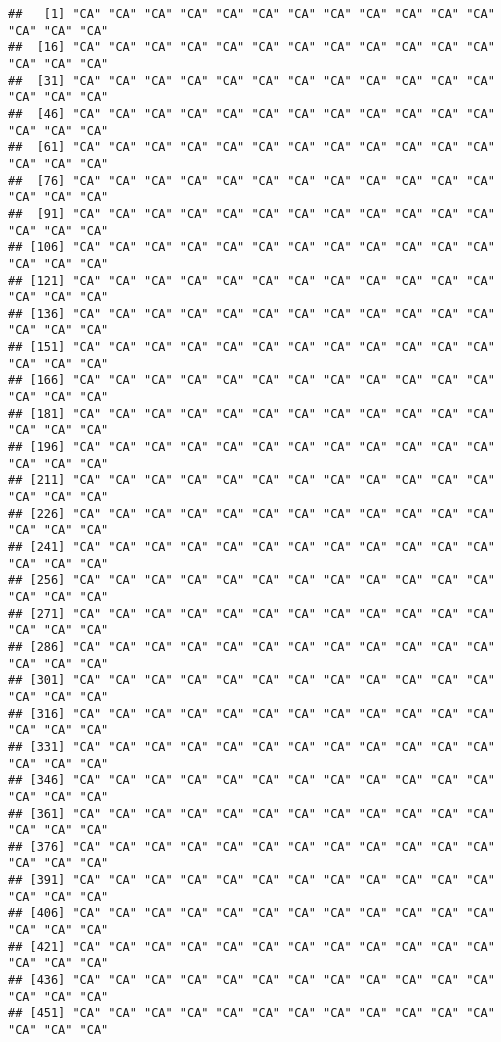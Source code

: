 \documentclass[
]{article}
\begin{document}
\begin{verbatim}
##   [1] "CA" "CA" "CA" "CA" "CA" "CA" "CA" "CA" "CA" "CA" "CA" "CA" "CA" "CA" "CA"
##  [16] "CA" "CA" "CA" "CA" "CA" "CA" "CA" "CA" "CA" "CA" "CA" "CA" "CA" "CA" "CA"
##  [31] "CA" "CA" "CA" "CA" "CA" "CA" "CA" "CA" "CA" "CA" "CA" "CA" "CA" "CA" "CA"
##  [46] "CA" "CA" "CA" "CA" "CA" "CA" "CA" "CA" "CA" "CA" "CA" "CA" "CA" "CA" "CA"
##  [61] "CA" "CA" "CA" "CA" "CA" "CA" "CA" "CA" "CA" "CA" "CA" "CA" "CA" "CA" "CA"
##  [76] "CA" "CA" "CA" "CA" "CA" "CA" "CA" "CA" "CA" "CA" "CA" "CA" "CA" "CA" "CA"
##  [91] "CA" "CA" "CA" "CA" "CA" "CA" "CA" "CA" "CA" "CA" "CA" "CA" "CA" "CA" "CA"
## [106] "CA" "CA" "CA" "CA" "CA" "CA" "CA" "CA" "CA" "CA" "CA" "CA" "CA" "CA" "CA"
## [121] "CA" "CA" "CA" "CA" "CA" "CA" "CA" "CA" "CA" "CA" "CA" "CA" "CA" "CA" "CA"
## [136] "CA" "CA" "CA" "CA" "CA" "CA" "CA" "CA" "CA" "CA" "CA" "CA" "CA" "CA" "CA"
## [151] "CA" "CA" "CA" "CA" "CA" "CA" "CA" "CA" "CA" "CA" "CA" "CA" "CA" "CA" "CA"
## [166] "CA" "CA" "CA" "CA" "CA" "CA" "CA" "CA" "CA" "CA" "CA" "CA" "CA" "CA" "CA"
## [181] "CA" "CA" "CA" "CA" "CA" "CA" "CA" "CA" "CA" "CA" "CA" "CA" "CA" "CA" "CA"
## [196] "CA" "CA" "CA" "CA" "CA" "CA" "CA" "CA" "CA" "CA" "CA" "CA" "CA" "CA" "CA"
## [211] "CA" "CA" "CA" "CA" "CA" "CA" "CA" "CA" "CA" "CA" "CA" "CA" "CA" "CA" "CA"
## [226] "CA" "CA" "CA" "CA" "CA" "CA" "CA" "CA" "CA" "CA" "CA" "CA" "CA" "CA" "CA"
## [241] "CA" "CA" "CA" "CA" "CA" "CA" "CA" "CA" "CA" "CA" "CA" "CA" "CA" "CA" "CA"
## [256] "CA" "CA" "CA" "CA" "CA" "CA" "CA" "CA" "CA" "CA" "CA" "CA" "CA" "CA" "CA"
## [271] "CA" "CA" "CA" "CA" "CA" "CA" "CA" "CA" "CA" "CA" "CA" "CA" "CA" "CA" "CA"
## [286] "CA" "CA" "CA" "CA" "CA" "CA" "CA" "CA" "CA" "CA" "CA" "CA" "CA" "CA" "CA"
## [301] "CA" "CA" "CA" "CA" "CA" "CA" "CA" "CA" "CA" "CA" "CA" "CA" "CA" "CA" "CA"
## [316] "CA" "CA" "CA" "CA" "CA" "CA" "CA" "CA" "CA" "CA" "CA" "CA" "CA" "CA" "CA"
## [331] "CA" "CA" "CA" "CA" "CA" "CA" "CA" "CA" "CA" "CA" "CA" "CA" "CA" "CA" "CA"
## [346] "CA" "CA" "CA" "CA" "CA" "CA" "CA" "CA" "CA" "CA" "CA" "CA" "CA" "CA" "CA"
## [361] "CA" "CA" "CA" "CA" "CA" "CA" "CA" "CA" "CA" "CA" "CA" "CA" "CA" "CA" "CA"
## [376] "CA" "CA" "CA" "CA" "CA" "CA" "CA" "CA" "CA" "CA" "CA" "CA" "CA" "CA" "CA"
## [391] "CA" "CA" "CA" "CA" "CA" "CA" "CA" "CA" "CA" "CA" "CA" "CA" "CA" "CA" "CA"
## [406] "CA" "CA" "CA" "CA" "CA" "CA" "CA" "CA" "CA" "CA" "CA" "CA" "CA" "CA" "CA"
## [421] "CA" "CA" "CA" "CA" "CA" "CA" "CA" "CA" "CA" "CA" "CA" "CA" "CA" "CA" "CA"
## [436] "CA" "CA" "CA" "CA" "CA" "CA" "CA" "CA" "CA" "CA" "CA" "CA" "CA" "CA" "CA"
## [451] "CA" "CA" "CA" "CA" "CA" "CA" "CA" "CA" "CA" "CA" "CA" "CA" "CA" "CA" "CA"

\end{verbatim}
\end{document}
